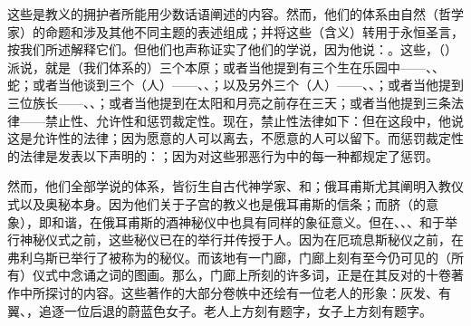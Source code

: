 这些是教义的拥护者所能用少数话语阐述的内容。然而，他们的体系由自然（哲学家）的命题和涉及其他不同主题的表述组成；并将这些（含义）转用于永恒圣言，按我们所述解释它们。但他们也声称证实了他们的学说，因为他说：。这些，（）派说，就是（我们体系的）三个本原；或者当他提到有三个生在乐园中——、、蛇；或者当他谈到三个（人）——、、；以及另外三个（人）——、、；或者当他提到三位族长——、、；或者当他提到在太阳和月亮之前存在三天；或者当他提到三条法律——禁止性、允许性和惩罚裁定性。现在，禁止性法律如下：但在这段中，他说这是允许性的法律；因为愿意的人可以离去，不愿意的人可以留下。而惩罚裁定性的法律是发表以下声明的：；因为对这些邪恶行为中的每一种都规定了惩罚。\par

然而，他们全部学说的体系，皆衍生自古代神学家、和；俄耳甫斯尤其阐明入教仪式以及奥秘本身。因为他们关于子宫的教义也是俄耳甫斯的信条；而脐（的意象），即和谐，在俄耳甫斯的酒神秘仪中也具有同样的象征意义。但在、、、和于举行神秘仪式之前，这些秘仪已在的举行并传授于人。因为在厄琉息斯秘仪之前，在弗利乌斯已举行了被称为的秘仪。而该地有一门廊，门廊上刻有至今仍可见的（所有）仪式中念诵之词的图画。那么，门廊上所刻的许多词，正是在其反对的十卷著作中所探讨的内容。这些著作的大部分卷帙中还绘有一位老人的形象：灰发、有翼、，追逐一位后退的蔚蓝色女子。老人上方刻有题字，女子上方刻有题字。\par



\section{}

